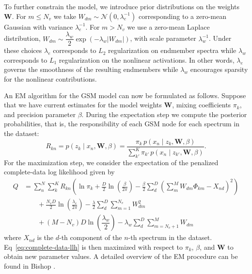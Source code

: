 \documentclass[remotesensing,article,submit,pdftex,moreauthors]{Definitions/mdpi}
\begin{document}
To further constrain the model, we introduce prior distributions on the weights $\mathbf{W}$. For $m\leq N_v$ we take $W_{dm}\sim\mathcal{N}(0, \lambda_e^{-1})$ corresponding to a zero-mean Gaussian with variance $\lambda_e^{-1}$. For $m>N_v$ we use a zero-mean Laplace distribution, $W_{dm}\sim\dfrac{\lambda_w}{2}\exp(-\lambda_w\lvert W_{dm}\rvert)$, with scale parameter $\lambda_w^{-1}$. Under these choices $\lambda_e$ corresponds to $L_2$ regularization on endmember spectra while $\lambda_w$ corresponds to $L_1$ regularization on the nonlinear activations. In other words, $\lambda_e$ governs the smoothness of the resulting endmembers while $\lambda_w$ encourages sparsity for the nonlinear contributions.

An EM algorithm for the GSM model can now be formulated as follows. Suppose that we have current estimates for the model weights $\mathbf{W}$, mixing coefficients $\pi_k$, and precision parameter $\beta$. During the expectation step we compute the posterior probabilities, that is, the responsibility of each GSM node for each spectrum in the dataset:
\begin{equation}\label{eq:responsibility}
    R_{kn}  = p(z_k \mid x_n, \mathbf{W}, \beta) = \dfrac{\pi_k \, p(x_n \mid z_k, \mathbf{W}, \beta)}{\sum\limits_{k'}^K \pi_{k'} \, p(x_n \mid z_{k'}, \mathbf{W}, \beta)}.
\end{equation}
For the maximization step, we consider the expectation of the penalized complete-data log likelihood given by
\begin{equation}\label{eq:complete-data-llh}
\begin{aligned}
    Q &= \sum_n^N\sum_k^K R_{kn} \left(\ln\pi_k + \frac{D}{2}\ln\left(\frac{\beta}{2\pi}\right) - \frac{\beta}{2}\sum_d^D\left(\sum_m^M W_{dm}\Phi_{km} - X_{nd}\right)^2\right) \\ 
    &\qquad + \frac{N_vD}{2}\ln\left(\frac{\lambda_e}{2\pi}\right) - \frac{\lambda}{2}\sum_d^D \sum_{m=1}^{N_v} W_{dm}^2  \\ 
    &\qquad + (M-N_v)D\ln\left(\dfrac{\lambda_w}{2}\right) - \lambda_w\sum_d^D\sum_{m=N_v+1}^{M} W_{dm}
\end{aligned}
\end{equation}
where $X_{nd}$ is the $d$-th component of the $n$-th spectrum in the dataset. Eq~\ref{eq:complete-data-llh} is then maximized with respect to $\pi_k$, $\beta$, and $\mathbf{W}$ to obtain new parameter values. A detailed overview of the EM procedure can be found in Bishop \cite{bishop-prml}.
\end{document}
